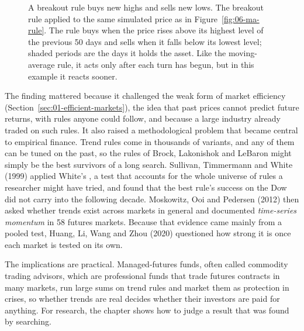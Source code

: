 \begin{figure}[htbp]
{%
}
\caption{A breakout rule buys new highs and sells new lows. The breakout rule applied to the same simulated price as in Figure~\ref{fig:06-ma-rule}. The rule buys when the price rises above its highest level of the previous 50 days and sells when it falls below its lowest level; shaded periods are the days it holds the asset. Like the moving-average rule, it acts only after each turn has begun, but in this example it reacts sooner.}
\label{fig:06-breakout-rule}
\end{figure}


The finding mattered because it challenged the weak form of market efficiency (Section~\ref{sec:01-efficient-markets}), the idea that past prices cannot predict future returns, with rules anyone could follow, and because a large industry already traded on such rules. It also raised a methodological problem that became central to empirical finance. Trend rules come in thousands of variants, and any of them can be tuned on the past, so the rules of Brock, Lakonishok and LeBaron might simply be the best survivors of a long search. Sullivan, Timmermann and White (1999) applied White's , a test that accounts for the whole universe of rules a researcher might have tried, and found that the best rule's success on the Dow did not carry into the following decade. Moskowitz, Ooi and Pedersen (2012) then asked whether trends exist across markets in general and documented \emph{time-series momentum} in 58 futures markets. Because that evidence came mainly from a pooled test, Huang, Li, Wang and Zhou (2020) questioned how strong it is once each market is tested on its own.

The implications are practical. Managed-futures funds, often called commodity trading advisors, which are professional funds that trade futures contracts in many markets, run large sums on trend rules and market them as protection in crises, so whether trends are real decides whether their investors are paid for anything. For research, the chapter shows how to judge a result that was found by searching. 


